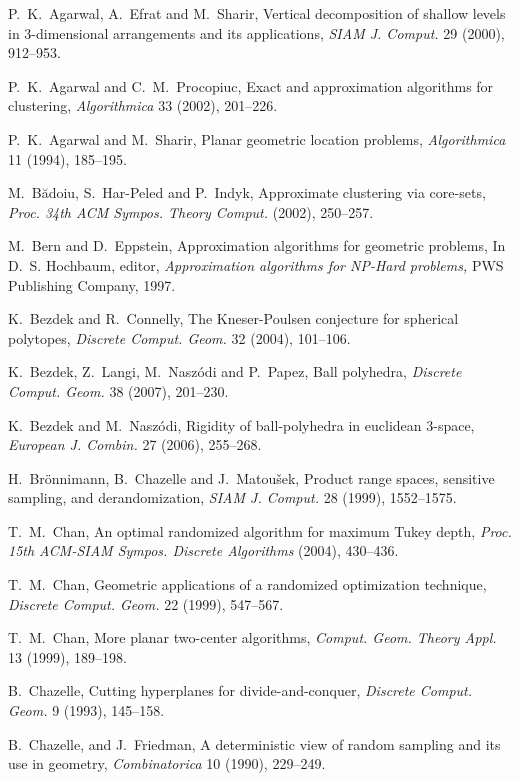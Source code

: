 \documentclass[a4paper,12pt]{article}
\begin{document}
\begin{thebibliography}{}

P.~K.~Agarwal, A.~Efrat and M.~Sharir,
Vertical decomposition of shallow levels in 3-dimensional arrangements and its applications,
{\it SIAM J. Comput.} 29 (2000), 912--953.

P.~K.~Agarwal and C.~M.~Procopiuc,
Exact and approximation algorithms for clustering,
{\it Algorithmica} 33 (2002), 201--226.

P.~K.~Agarwal and M.~Sharir,
Planar geometric location problems,
{\it Algorithmica} 11 (1994), 185--195.

M.~B\u{a}doiu, S.~Har-Peled and P.~Indyk,
Approximate clustering via core-sets,
{\it Proc. 34th ACM Sympos. Theory Comput.} (2002), 250--257.

M.~Bern and D.~Eppstein,
Approximation algorithms for geometric problems,
In D.~S. Hochbaum, editor, {\it Approximation algorithms for NP-Hard problems,} PWS Publishing Company, 1997.

K.~Bezdek and R.~Connelly,
The Kneser-Poulsen conjecture for spherical polytopes,
{\it Discrete Comput. Geom.} 32 (2004), 101--106.

K.~Bezdek, Z.~Langi, M.~Nasz\'{o}di and P.~Papez,
Ball polyhedra,
{\it Discrete Comput. Geom.} 38 (2007), 201--230.

K.~Bezdek and M.~Nasz\'{o}di,
Rigidity of ball-polyhedra in euclidean 3-space,
{\it European J. Combin.} 27 (2006), 255--268.

H.~Br\"{o}nnimann, B.~Chazelle and J.~Matou\v{s}ek,
Product range spaces, sensitive sampling, and derandomization,
{\it SIAM J. Comput.} 28 (1999), 1552--1575.

T.~M.~Chan,
An optimal randomized algorithm for maximum Tukey depth,
{\it Proc. 15th ACM-SIAM Sympos. Discrete Algorithms} (2004), 430--436.

T.~M.~Chan,
Geometric applications of a randomized optimization technique,
{\it Discrete Comput. Geom.} 22 (1999), 547--567.

T.~M.~Chan,
More planar two-center algorithms,
{\it Comput. Geom. Theory Appl.} 13 (1999), 189--198.

B.~Chazelle,
Cutting hyperplanes for divide-and-conquer,
{\it Discrete Comput. Geom.} 9 (1993), 145--158.

B.~Chazelle, and J.~Friedman,
A deterministic view of random sampling and its use in geometry,
{\it Combinatorica} 10 (1990), 229--249.


\end{thebibliography}
\end{document}
